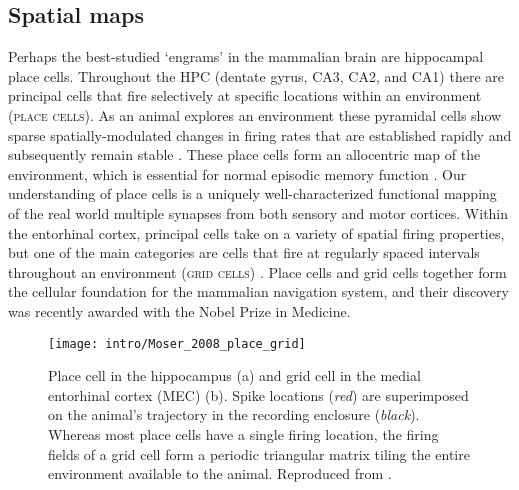 \subsection{Spatial maps}
\label{sec:intro:memory:spatial_maps}
Perhaps the best-studied `engrams' in the mammalian brain are hippocampal place cells.
Throughout the \ac{HPC} (dentate gyrus, CA3, CA2, and CA1) there are principal cells that fire selectively at specific locations within an environment (\textsc{place cells}).
As an animal explores an environment these pyramidal cells show sparse spatially-modulated changes in firing rates that are established rapidly and subsequently remain stable \citep{O'Keefe1971, Thompson1990, Frank2004}.
These place cells form an allocentric map of the environment, which is essential for normal episodic memory function \citep{Smith2006c, Nakazawa2004, Buzsaki2013}.
Our understanding of place cells is a uniquely well-characterized functional mapping of the real world multiple synapses from both sensory and motor cortices.
Within the entorhinal cortex, principal cells take on a variety of spatial firing properties, but one of the main categories are cells that fire at regularly spaced intervals throughout an environment (\textsc{grid cells}) \citep{Hafting2005, Moser2014a}.
Place cells and grid cells together form the cellular foundation for the mammalian navigation system, and their discovery was recently awarded with the Nobel Prize in Medicine.

\begin{figure}
	\centering
	\texttt{[image: intro/Moser\_2008\_place\_grid]}
	\caption[Place cell in the hippocampus and grid cell in the MEC]{Place cell in the hippocampus (a) and grid cell in the medial entorhinal cortex (MEC) (b).
	Spike locations (\emph{red}) are superimposed on the animal’s trajectory in the recording enclosure (\emph{black}).
	Whereas most place cells have a single firing location, the firing fields of a grid cell form a periodic triangular matrix tiling the entire environment available to the animal.
	Reproduced from \citet{Moser2008}.}
	\label{fig:intro:memory:place_grid}
\end{figure}

